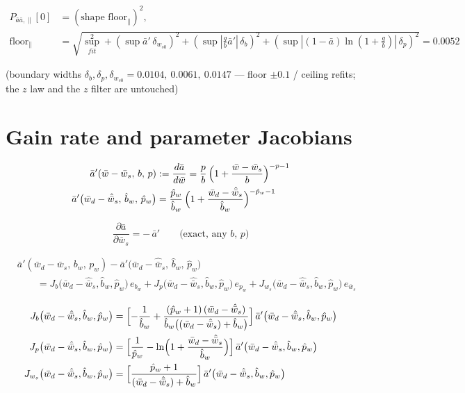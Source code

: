 \documentclass[11pt,a4paper,fontset=none]{ctexart}
\begin{document}
\begin{align*}
P_{\bar{a}\bar{a},\parallel}[0] &= (\text{shape floor}_\parallel)^2, \\
\text{floor}_\parallel
  &= \sqrt{\textstyle\sup^2_{fit} + (\sup\bar{a}'\,\delta_{w_{s0}})^2
    + (\sup|\tfrac{g}{b}\bar{a}'|\,\delta_b)^2
    + (\sup|(1{-}\bar{a})\ln(1{+}\tfrac{g}{b})|\,\delta_p)^2}
  = 0.0052
\end{align*}

(boundary widths $\delta_{b},\delta_{p},\delta_{w_{s0}}
= 0.0104,\ 0.0061,\ 0.0147$ --- floor $\pm 0.1$ / ceiling refits;
the $z$ law and the $z$ filter are untouched)

\section{Gain rate and parameter Jacobians}

\begin{align*}
\bar{a}'(\bar{w}-\bar{w}_s,\, b,\, p)
  &:= \frac{d\bar{a}}{d\bar{w}}
   = \frac{p}{b}\,\Bigl(1 + \frac{\bar{w}-\bar{w}_s}{b}\Bigr)^{-p-1} \\
\bar{a}'\bigl(\bar{w}_d-\hat{\bar{w}}_s,\, \hat{b}_w,\, \hat{p}_w\bigr)
  &= \frac{\hat{p}_w}{\hat{b}_w}\,
     \Bigl(1 + \frac{\bar{w}_d-\hat{\bar{w}}_s}{\hat{b}_w}\Bigr)^{-\hat{p}_w-1}
\end{align*}

\begin{equation*}
\frac{\partial \bar{a}}{\partial \bar{w}_s} = -\,\bar{a}'
\qquad \text{(exact, any $b$, $p$)}
\end{equation*}

\begin{align*}
&\bar{a}'(\bar{w}_d-\bar{w}_s,\, b_w,\, p_w)
 - \bar{a}'\bigl(\bar{w}_d-\hat{\bar{w}}_s,\, \hat{b}_w,\, \hat{p}_w\bigr) \\
&\qquad = J_b\bigl(\bar{w}_d-\hat{\bar{w}}_s, \hat{b}_w, \hat{p}_w\bigr)\,e_{b_w}
 + J_p\bigl(\bar{w}_d-\hat{\bar{w}}_s, \hat{b}_w, \hat{p}_w\bigr)\,e_{p_w}
 + J_{w_s}\bigl(\bar{w}_d-\hat{\bar{w}}_s, \hat{b}_w, \hat{p}_w\bigr)\,e_{\bar{w}_s}
\end{align*}

\begin{align*}
J_b\bigl(\bar{w}_d-\hat{\bar{w}}_s, \hat{b}_w, \hat{p}_w\bigr)
  &= \Bigl[-\frac{1}{\hat{b}_w}
     + \frac{(\hat{p}_w+1)\,(\bar{w}_d-\hat{\bar{w}}_s)}
            {\hat{b}_w\bigl((\bar{w}_d-\hat{\bar{w}}_s)+\hat{b}_w\bigr)}\Bigr]\,
     \bar{a}'\bigl(\bar{w}_d-\hat{\bar{w}}_s, \hat{b}_w, \hat{p}_w\bigr) \\
J_p\bigl(\bar{w}_d-\hat{\bar{w}}_s, \hat{b}_w, \hat{p}_w\bigr)
  &= \Bigl[\frac{1}{\hat{p}_w}
     - \ln\Bigl(1 + \frac{\bar{w}_d-\hat{\bar{w}}_s}{\hat{b}_w}\Bigr)\Bigr]\,
     \bar{a}'\bigl(\bar{w}_d-\hat{\bar{w}}_s, \hat{b}_w, \hat{p}_w\bigr) \\
J_{w_s}\bigl(\bar{w}_d-\hat{\bar{w}}_s, \hat{b}_w, \hat{p}_w\bigr)
  &= \Bigl[\frac{\hat{p}_w+1}
            {(\bar{w}_d-\hat{\bar{w}}_s)+\hat{b}_w}\Bigr]\,
     \bar{a}'\bigl(\bar{w}_d-\hat{\bar{w}}_s, \hat{b}_w, \hat{p}_w\bigr)
\end{align*}
\end{document}
